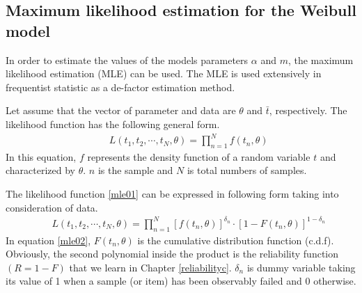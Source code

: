 \subsection{Maximum likelihood estimation for the Weibull model} \label{mleweil}
In order to estimate the values of the models parameters $\alpha$ and $m$, the maximum likelihood estimation (MLE) can be used. The MLE is used extensively in frequentist statistic as a de-factor estimation method. 

Let assume that the vector of parameter and data are $\theta$ and $\bar t$, respectively. The likelihood function has the following general form.
\begin{eqnarray}
 && L(t_1,t_2,\cdots,t_N,\theta) = \prod_{n=1}^N f(t_n,\theta) \label{mle01}
\end{eqnarray}
In this equation, $f$ represents the density function of a random variable $t$ and characterized by $\theta$. $n$ is the sample and $N$ is total numbers of samples.

The likelihood function \eqref{mle01} can be expressed in following form taking into consideration of data.
\begin{eqnarray}
 && L(t_1,t_2,\cdots,t_N,\theta) = \prod_{n=1}^N [f(t_n,\theta)]^{\delta_n}\cdot [1-F(t_n,\theta)]^{1-\delta_n} \label{mle02}
\end{eqnarray}
In equation \eqref{mle02}, $F(t_n,\theta)$ is the cumulative distribution function (c.d.f). Obviously, the second polynomial inside the product is the reliability function $(R=1-F)$ that we learn in Chapter \ref{reliabilityc}. $\delta_n$ is dummy variable taking its value of 1 when a sample (or item) has been observably failed and 0 otherwise. 

